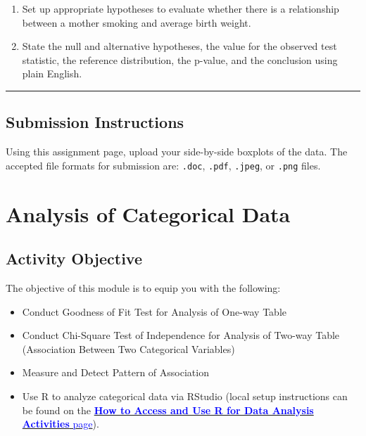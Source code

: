 \documentclass[oneside,openany]{book}
\providecommand{\tightlist}{%
  \setlength{\itemsep}{0pt}\setlength{\parskip}{0pt}}
\begin{document}
\begin{enumerate}
\def\labelenumi{\arabic{enumi}.}
\tightlist
\item
  Set up appropriate hypotheses to evaluate whether there is a relationship between a mother smoking and average birth weight.
\item
  State the null and alternative hypotheses, the value for the observed test statistic, the reference distribution, the p-value, and the conclusion using plain English.
\end{enumerate}

\begin{center}\rule{0.5\linewidth}{0.5pt}\end{center}

\section{Submission Instructions}\label{submission-instructions}

Using this assignment page, upload your side-by-side boxplots of the data. The accepted file formats for  submission are: \texttt{.doc}, \texttt{.pdf}, \texttt{.jpeg}, or \texttt{.png} files.

\chapter{Analysis of Categorical Data}\label{activity-9---analysis-of-categorical-data}

\section{Activity Objective}\label{activity-objective-6}

The objective of this module is to equip you with the following:

\begin{itemize}
\tightlist
\item
  Conduct Goodness of Fit Test for Analysis of One-way Table
\item
  Conduct Chi-Square Test of Independence for Analysis of Two-way Table (Association Between Two Categorical Variables)
\item
  Measure and Detect Pattern of Association
\item
  Use R to analyze categorical data via RStudio (local setup instructions can be found on the \hyperref[how-to-set-up-r-for-data-analysis-activities]{\textcolor{blue}{\textbf{How to Access and Use R for Data Analysis Activities} page}}).
\end{itemize}
\end{document}
